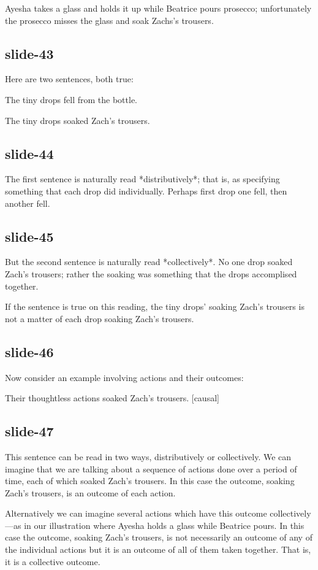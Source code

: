 \documentclass[12pt,\papersize]{extarticle}
\begin{document}
Ayesha takes a glass and holds it up while Beatrice pours prosecco;
unfortunately the prosecco misses the glass and soak Zachs’s trousers.

\subsection{slide-43}
Here are two sentences, both true:

The tiny drops fell from the bottle.


The tiny drops soaked Zach’s trousers.


\subsection{slide-44}
The first sentence is naturally read *distributively*; that is, as specifying something
that each drop did individually.  Perhaps first drop one fell, then another fell.

\subsection{slide-45}
But the second sentence is naturally read *collectively*.
No one drop soaked Zach’s trousers; rather the soaking was something that the drops
accomplised together.

If the sentence is true on this reading, the tiny drops' soaking Zach’s trousers is not
a matter of each drop soaking Zach’s trousers.

\subsection{slide-46}
Now consider an example involving actions and their outcomes:

Their thoughtless actions soaked Zach’s trousers. [causal]

\subsection{slide-47}
This sentence can be read in two ways, distributively or collectively.
We can imagine that we are talking about a sequence of actions done
over a period of time, each of which soaked Zach’s trousers.
In this case the outcome, soaking Zach’s trousers, is an outcome of each action.

Alternatively we can imagine several actions which have this outcome collectively---as in
our illustration where Ayesha holds a glass while Beatrice pours.
In this case the outcome, soaking Zach’s trousers, is not necessarily an outcome of any of the
individual actions but it is an outcome of all of them taken together.
That is, it is a collective outcome.
\end{document}
